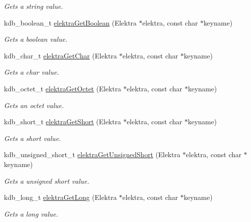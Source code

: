 \begin{DoxyCompactItemize}
\begin{DoxyCompactList}\small\item\em Gets a string value. \end{DoxyCompactList}\item 
kdb\+\_\+boolean\+\_\+t \hyperlink{group__highlevel_ga27fc805ae90d04aaacbdd754cb27687b}{elektra\+Get\+Boolean} (Elektra $\ast$elektra, const char $\ast$keyname)
\begin{DoxyCompactList}\small\item\em Gets a boolean value. \end{DoxyCompactList}\item 
kdb\+\_\+char\+\_\+t \hyperlink{group__highlevel_gab25c1deba0f9521206a9e1ec30a819d6}{elektra\+Get\+Char} (Elektra $\ast$elektra, const char $\ast$keyname)
\begin{DoxyCompactList}\small\item\em Gets a char value. \end{DoxyCompactList}\item 
kdb\+\_\+octet\+\_\+t \hyperlink{group__highlevel_ga69ae4ca538288d5e38f53a727f4ea7de}{elektra\+Get\+Octet} (Elektra $\ast$elektra, const char $\ast$keyname)
\begin{DoxyCompactList}\small\item\em Gets an octet value. \end{DoxyCompactList}\item 
kdb\+\_\+short\+\_\+t \hyperlink{group__highlevel_gab5dc2cac2b119cfc672bf28db8ec21df}{elektra\+Get\+Short} (Elektra $\ast$elektra, const char $\ast$keyname)
\begin{DoxyCompactList}\small\item\em Gets a short value. \end{DoxyCompactList}\item 
kdb\+\_\+unsigned\+\_\+short\+\_\+t \hyperlink{group__highlevel_ga373e1a04f8252f814be4b3ff5cb9812d}{elektra\+Get\+Unsigned\+Short} (Elektra $\ast$elektra, const char $\ast$keyname)
\begin{DoxyCompactList}\small\item\em Gets a unsigned short value. \end{DoxyCompactList}\item 
kdb\+\_\+long\+\_\+t \hyperlink{group__highlevel_gad4198ec223f01c3a6cfb1b78de34bc9e}{elektra\+Get\+Long} (Elektra $\ast$elektra, const char $\ast$keyname)
\begin{DoxyCompactList}\small\item\em Gets a long value. \end{DoxyCompactList}\item 

\end{DoxyCompactItemize}
